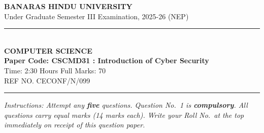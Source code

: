\documentclass[11pt,a4paper]{article}
\begin{document}
\begin{center}
  {\large\bfseries BANARAS HINDU UNIVERSITY}\\[2pt]
  {\normalsize Under Graduate Semester III Examination, 2025-26 (NEP)}\\[6pt]
  \rule{0.8\linewidth}{0.5pt}\\[6pt]
  {\large\bfseries COMPUTER SCIENCE}\\[4pt]
  {\large\bfseries Paper Code: CSCMD31 : Introduction of Cyber Security}\\[4pt]
  {\normalsize Time: 2:30 Hours \hfill Full Marks: 70}\\[2pt]
  {\small REF NO. CECONF/N/099}
\end{center}
\rule{\linewidth}{0.4pt}
\smallskip

\noindent \textit{Instructions: Attempt any \textbf{five} questions. Question No.~1 is \textbf{compulsory}. All questions carry equal marks (14 marks each). Write your Roll No.\ at the top immediately on receipt of this question paper.}

\bigskip
\end{document}
